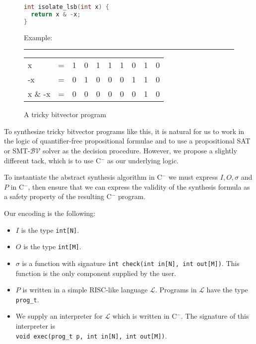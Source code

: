 \documentclass[a4paper]{llncs}
\newcommand{\newC}{C$^-$\xspace}
\begin{document}
\begin{figure}
\centering
\begin{minipage}{0.45\linewidth}
 \begin{lstlisting}[language=C]
int isolate_lsb(int x) {
  return x & -x;
}
 \end{lstlisting}
\end{minipage}
\begin{minipage}{0.45\linewidth}
 
Example:

\hrule

\begin{tabular}{llcccccccc}
 x       & = & 1 & 0 & 1 & 1 & 1 & 0 & 1 & 0 \\
 -x      & = & 0 & 1 & 0 & 0 & 0 & 1 & 1 & 0 \\
 x \& -x & = & 0 & 0 & 0 & 0 & 0 & 0 & 1 & 0
\end{tabular}
\end{minipage}


 \caption{A tricky bitvector program}
  \label{fig:bitvector-program}
\end{figure}


To synthesize tricky bitvector programs like this, it is natural for us to
work in the logic of quantifier-free propositional formulae and to use a
propositional SAT or SMT-$\mathcal{BV}$ solver as the decision procedure. 
However, we propose a slightly different tack, which is to use \newC as
our underlying logic.

To instantiate the abstract synthesis algorithm in \newC we must express $I, O,
\sigma$ and $P$ in \newC, then ensure that we can express the validity of the
synthesis formula as a safety property of the resulting \newC program.

Our encoding is the following:
%
\begin{itemize}
 \item $I$ is the type \verb|int[N]|.
 \item $O$ is the type \verb|int[M]|.
 \item $\sigma$ is a function with signature
 \verb|int check(int in[N], int out[M])|. This function is the only component supplied
 by the user.
 \item $P$ is written in a simple RISC-like language $\mathcal{L}$.  Programs in $\mathcal{L}$
 have the type \verb|prog_t|.
 \item We supply an interpreter for $\mathcal{L}$ which is written in \newC.  The signature
 of this interpreter is \\
 \verb|void exec(prog_t p, int in[N], int out[M])|.
\end{itemize}
\end{document}
